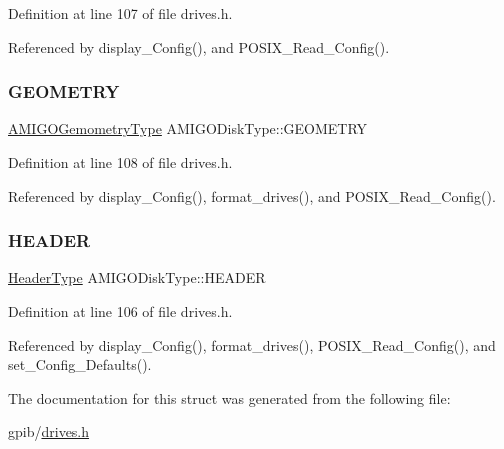 Definition at line 107 of file drives.\+h.



Referenced by display\+\_\+\+Config(), and P\+O\+S\+I\+X\+\_\+\+Read\+\_\+\+Config().

\mbox{\label{structAMIGODiskType_aa75cfbfabf8081ff7bca08cf87af4da8}} 
\subsubsection{\texorpdfstring{G\+E\+O\+M\+E\+T\+RY}{GEOMETRY}}
{\footnotesize\ttfamily \hyperlink{structAMIGOGemometryType}{A\+M\+I\+G\+O\+Gemometry\+Type} A\+M\+I\+G\+O\+Disk\+Type\+::\+G\+E\+O\+M\+E\+T\+RY}



Definition at line 108 of file drives.\+h.



Referenced by display\+\_\+\+Config(), format\+\_\+drives(), and P\+O\+S\+I\+X\+\_\+\+Read\+\_\+\+Config().

\mbox{\label{structAMIGODiskType_a9814efe6f564b104fc7e0100231908a8}} 
\subsubsection{\texorpdfstring{H\+E\+A\+D\+ER}{HEADER}}
{\footnotesize\ttfamily \hyperlink{structHeaderType}{Header\+Type} A\+M\+I\+G\+O\+Disk\+Type\+::\+H\+E\+A\+D\+ER}



Definition at line 106 of file drives.\+h.



Referenced by display\+\_\+\+Config(), format\+\_\+drives(), P\+O\+S\+I\+X\+\_\+\+Read\+\_\+\+Config(), and set\+\_\+\+Config\+\_\+\+Defaults().



The documentation for this struct was generated from the following file\+:\begin{DoxyCompactItemize}
\item 
gpib/\hyperlink{drives_8h}{drives.\+h}\end{DoxyCompactItemize}
